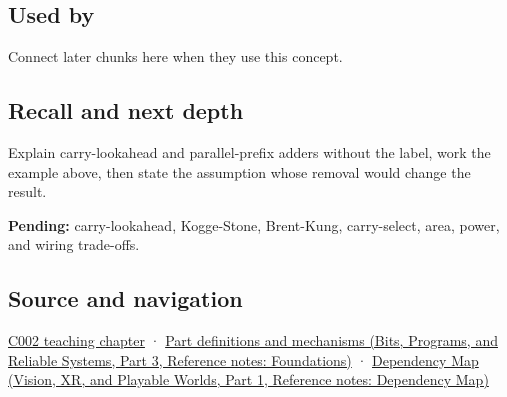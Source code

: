 \subsection{Used by}\label{appendix-b5c46b2d94ff-used-by}

\hypertarget{appendix-b5c46b2d94ff-used-by}{}

Connect later chunks here when they use this concept.

\subsection{Recall and next depth}\label{appendix-b5c46b2d94ff-recall-and-next-depth}

\hypertarget{appendix-b5c46b2d94ff-recall-and-next-depth}{}

Explain carry-lookahead and parallel-prefix adders without the label, work the example above, then state the assumption whose removal would change the result.

\textbf{Pending:} carry-lookahead, Kogge-Stone, Brent-Kung, carry-select, area, power, and wiring trade-offs.

\subsection{Source and navigation}\label{appendix-b5c46b2d94ff-source-and-navigation}

\hypertarget{appendix-b5c46b2d94ff-source-and-navigation}{}

\hyperref[01-foundations-i-ch001-arithmetic-becomes-a-policy]{C002 teaching chapter} · \href{../01-Bits-Programs-and-Reliable-Systems-P03/main.pdf\#nameddest=appendix-fd090d982a15}{Part definitions and mechanisms (Bits, Programs, and Reliable Systems, Part 3, Reference notes: Foundations)} · \href{../07-Vision-XR-and-Playable-Worlds-P01/main.pdf\#nameddest=appendix-4ad47bdd269a}{Dependency Map (Vision, XR, and Playable Worlds, Part 1, Reference notes: Dependency Map)}
